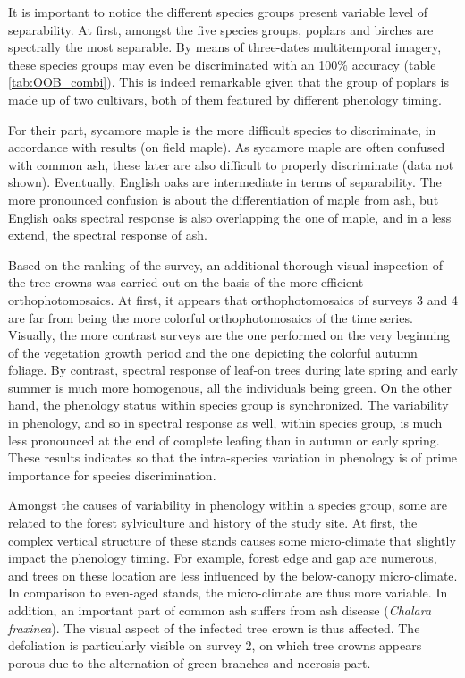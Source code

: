 \documentclass[remotesensing,article,submit,moreauthors,pdftex,12pt,a4paper]{mdpi} %
\begin{document}
It is important to notice the different species groups present variable level of separability. 
At first, amongst the five species groups, poplars and birches are spectrally the most separable. 
By means of three-dates multitemporal imagery, these species groups may even be discriminated with an 100\% accuracy (table \ref{tab:OOB_combi}). 
This is indeed remarkable given that the group of poplars is made up of two cultivars, both of them featured by different phenology timing. 

For their part, sycamore maple is the more difficult species to discriminate, in accordance with \citeauthor{hill_mapping_2010} \cite{hill_mapping_2010} results (on field maple). 
As sycamore maple are often confused with common ash, these later are also difficult to properly discriminate (data not shown). 
Eventually, English oaks are intermediate in terms of separability. 
The more pronounced confusion is about the differentiation of maple from ash, but English oaks spectral response is also overlapping the one of maple, and in a less extend, the spectral response of ash. 

Based on the ranking of the survey, an additional thorough visual inspection of the tree crowns was carried out on the basis of the more efficient orthophotomosaics. 
At first, it appears that orthophotomosaics of surveys 3 and 4 are far from being the more colorful orthophotomosaics of the time series. 
Visually, the more contrast surveys are the one performed on the very beginning of the vegetation growth period and the one depicting the colorful autumn foliage. 
By contrast, spectral response of leaf-on trees during late spring and early summer is much more homogenous, all the individuals being green. 
On the other hand, the phenology status within species group is synchronized. 
The variability in phenology, and so in spectral response as well, within species group, is much less pronounced at the end of complete leafing than in autumn or early spring. 
These results indicates so that the intra-species variation in phenology is of prime importance for species discrimination.

Amongst the causes of variability in phenology within a species group, some are related to the forest sylviculture and history of the study site. 
At first, the complex vertical structure of these stands causes some micro-climate that slightly impact the phenology timing. 
For example, forest edge and gap are numerous, and trees on these location are less influenced by the below-canopy micro-climate. 
In comparison to even-aged stands, the micro-climate are thus more variable. 
In addition, an important part of common ash suffers from ash disease (\textit{Chalara fraxinea}). 
The visual aspect of the infected tree crown is thus affected. 
The defoliation is particularly visible on survey 2, on which tree crowns appears porous due to the alternation of green branches and necrosis part. 
\end{document}
